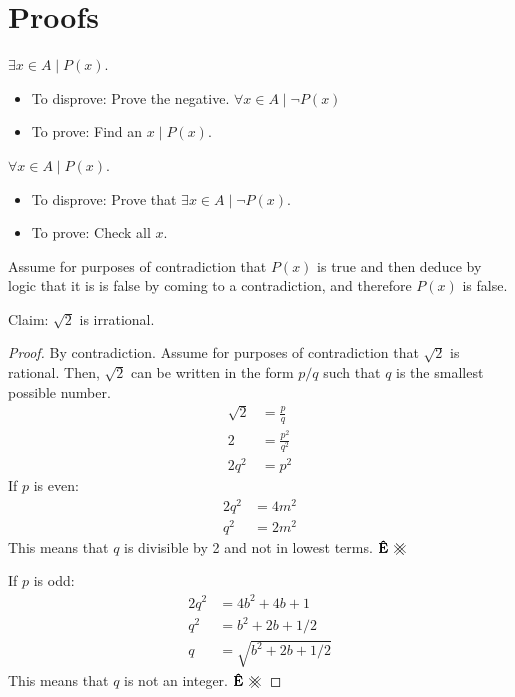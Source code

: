 \documentclass[11pt]{scrartcl}
\theoremstyle{dotlessP}
\theoremstyle{dotlessN}
\newcommand\contradiction{\mathbin{\mathpalette\xhash\relax}}
\newcommand{\xhash}[2]{\ooalign{%
Ê $#1\xxhash{#1}{-45}$\cr
Ê $#1\xxhash{#1}{45}$\cr
Ê }%
}
\newcommand{\xxhash}[2]{\rotatebox[origin=c]{#2}{$#1\parallel$}}
\begin{document}
\section{Proofs}	
\begin{definition}
	$\exists x \in A \mid P(x)$.
\end{definition}
\begin{itemize}
	\item To disprove: Prove the negative. $\forall x \in A \mid \neg P(x)$
	\item To prove: Find an $x \mid P(x)$.
\end{itemize}	
\begin{definition}
	$\forall x \in A \mid P(x)$.
\end{definition}
\begin{itemize}
	\item To disprove: Prove that $\exists x \in A \mid \neg P(x)$.
	\item To prove: Check all  $x$.
\end{itemize}
\begin{definition}
	Assume for purposes of contradiction that $P(x)$ is true and then deduce by logic that it is is false by coming to a contradiction, and therefore $P(x)$ is false.
\end{definition}
\begin{example}
	Claim: $\sqrt 2$ is irrational.
\end{example}
\begin{proof}
	By contradiction. Assume for purposes of contradiction that $\sqrt 2$ is rational. Then,  $\sqrt 2$ can be written in the form $p/q$ such that $q$ is the smallest possible number. 
	\\
	\begin{align*}
		\sqrt 2 &= \frac{p}{q} \\
		2 &= \frac{p^2}{q^2} \\
		2q^2 &= p^2
	\end{align*}
	If $p$ is even:
	\begin{align*}
		2q^2 &= 4m^2 \\
		q^2 &= 2m^2 
	\end{align*}
	This means that $q$ is divisible by 2 and not in lowest terms. $\contradiction$

	If  $p$ is odd:
	\begin{align*}
		2q^2 &= 4b^2 + 4b + 1 \\
		q^2 &= b^2 + 2b + 1/2 \\
		q &= \sqrt{b^2 + 2b + 1/2}
	\end{align*}
	This means that  $q$ is not an integer. $\contradiction$
	\end{proof}
\end{document}

